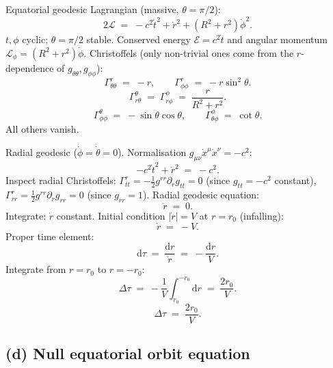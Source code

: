 \documentclass[11pt]{article}
\newcommand{\de}{\mathrm{d}}
\begin{document}
Equatorial geodesic Lagrangian (massive, $\theta=\pi/2$):
\[
2\mathcal L \;=\; -c^2\dot t^2 + \dot r^2 + (R^2+r^2)\dot\phi^2.
\]
$t,\phi$ cyclic; $\theta=\pi/2$ stable. Conserved energy $\mathcal E=c^2\dot t$ and angular momentum $\mathcal L_\phi=(R^2+r^2)\dot\phi$. Christoffels (only non-trivial ones come from the $r$-dependence of $g_{\theta\theta},g_{\phi\phi}$):
\[
\Gamma^r_{\theta\theta} \;=\; -r,\qquad \Gamma^r_{\phi\phi} \;=\; -r\sin^2\theta.
\]
\[
\Gamma^\theta_{r\theta} \;=\; \Gamma^\phi_{r\phi} \;=\; \frac{r}{R^2+r^2}.
\]
\[
\Gamma^\theta_{\phi\phi} \;=\; -\sin\theta\cos\theta,\qquad \Gamma^\phi_{\theta\phi} \;=\; \cot\theta.
\]
All others vanish.

Radial geodesic ($\dot\phi=\dot\theta=0$). Normalisation $g_{\mu\nu}\dot x^\mu\dot x^\nu=-c^2$:
\[
-c^2\dot t^2 + \dot r^2 \;=\; -c^2.
\]
Inspect radial Christoffels: $\Gamma^r_{tt}=-\tfrac12 g^{rr}\partial_r g_{tt}=0$ (since $g_{tt}=-c^2$ constant), $\Gamma^r_{rr}=\tfrac12 g^{rr}\partial_r g_{rr}=0$ (since $g_{rr}=1$). Radial geodesic equation:
\[
\ddot r \;=\; 0.
\]
Integrate: $\dot r$ constant. Initial condition $|\dot r|=V$ at $r=r_0$ (infalling):
\[
\dot r \;=\; -V.
\]
Proper time element:
\[
\de\tau \;=\; \frac{\de r}{\dot r} \;=\; -\frac{\de r}{V}.
\]
Integrate from $r=r_0$ to $r=-r_0$:
\[
\Delta\tau \;=\; -\frac{1}{V}\!\int_{r_0}^{-r_0}\!\de r \;=\; \frac{2r_0}{V}.
\]
\begin{equation}
\boxed{\;\Delta\tau \;=\; \frac{2r_0}{V}.\;}
\label{eq:transit}
\end{equation}

\subsection*{(d) Null equatorial orbit equation}
\end{document}
